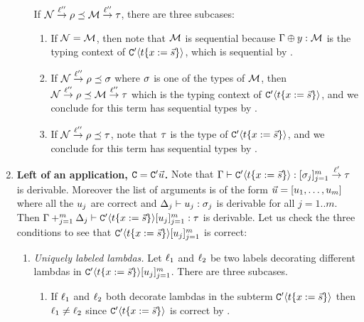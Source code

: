 \begin{enumerate}
\begin{enumerate}
      If $\mathcal{N} \overset{\ell''}{\to} \rho \preceq \mathcal{M} \overset{\ell''}{\to} \tau$,
      there are three subcases:
      \begin{enumerate}
      \item If $\mathcal{N} = \mathcal{M}$, then note that $\mathcal{M}$ is sequential
            because $\Gamma \oplus y : \mathcal{M}$ is the typing context of $\mathtt{C}'\langle t\{x := \vec{s}\}\rangle$,
           which is sequential by \ih.
      \item If $\mathcal{N} \overset{\ell''}{\to} \rho \preceq \sigma$ where $\sigma$ is one of the types of $\mathcal{M}$,
            then $\mathcal{N} \overset{\ell''}{\to} \rho \preceq \mathcal{M} \overset{\ell''}{\to} \tau$ which is the typing context
            of $\mathtt{C}'\langle t\{x := \vec{s}\}\rangle$,
            and we conclude for this term has sequential types by \ih.
      \item If $\mathcal{N} \overset{\ell''}{\to} \rho \preceq \tau$,
            note that $\tau$ is the type of $\mathtt{C}'\langle t\{x := \vec{s}\}\rangle$,
            and we conclude for this term has sequential types by \ih.
      \end{enumerate}
    \end{enumerate}
  \item {\bf Left of an application, $\mathtt{C} = \mathtt{C}'\vec{u}$.}
    \label{subject_reduction__case_left_application}
    Note that $\Gamma \vdash \mathtt{C}'\langle t\{x := \vec{s}\}\rangle : [\sigma_j]_{j=1}^m \overset{\ell'}{\to} \tau$
    is derivable.
    Moreover the list of arguments is of the form
    $\vec{u} = [u_1,\hdots,u_m]$ where all the $u_j$ are correct
    and $\Delta_j \vdash u_j : \sigma_j$ is derivable for all $j=1..m$.
    Then $\Gamma +_{j=1}^m \Delta_j \vdash \mathtt{C}'\langle t\{x := \vec{s}\}\rangle[u_j]_{j=1}^{m} : \tau$
    is derivable.
    Let us check the three conditions to see that $\mathtt{C}'\langle t\{x := \vec{s}\}\rangle[u_j]_{j=1}^{m}$ is correct:
    \begin{enumerate}
    \item {\em Uniquely labeled lambdas.}
      Let $\ell_1$ and $\ell_2$ be two labels decorating different lambdas in $\mathtt{C}'\langle t\{x := \vec{s}\}\rangle[u_j]_{j=1}^{m}$.
      There are three subcases.
      \begin{enumerate}
      \item
        If $\ell_1$ and $\ell_2$ both decorate lambdas in the subterm $\mathtt{C}'\langle t\{x := \vec{s}\}\rangle$
        then $\ell_1 \neq \ell_2$ since $\mathtt{C}'\langle t\{x := \vec{s}\}\rangle$ is correct by \ih.

\end{enumerate}
\end{enumerate}
\end{enumerate}

